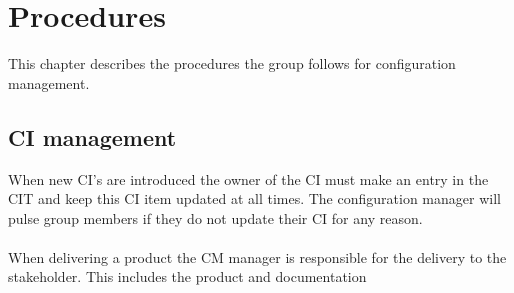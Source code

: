 \chapter{Procedures}
This chapter describes the procedures the group follows for configuration management.

\section{CI management}
When new CI's are introduced the owner of the CI must make an entry in the CIT and keep this CI item updated at all times. The configuration manager will pulse group members if they do not update their CI for any reason. 
~\\
~\\
When delivering a product the CM manager is responsible for the delivery to the stakeholder. This includes the product and documentation